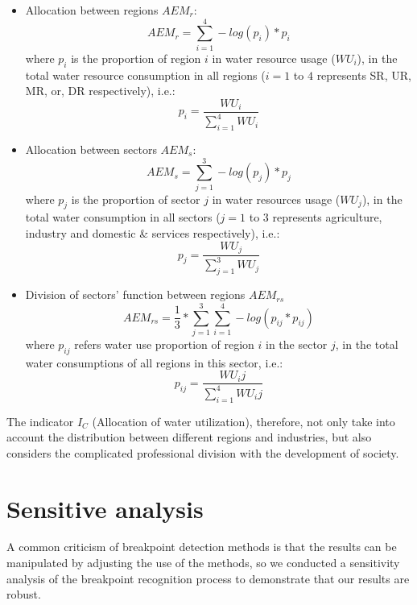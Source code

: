 \documentclass[9pt,twoside,lineno]{pnas-new}
\begin{document}
    \begin{itemize}
        \item Allocation between regions $AEM_r$:
            $$ AEM_r = \sum_{i=1}^4 -log(p_{i}) * p_{i} $$
            where $p_i$ is the proportion of region $i$ in water resource usage ($WU_i$), in the total water resource consumption in all regions ($i=1$ to $4$ represents SR, UR, MR, or, DR respectively), i.e.:
            $$ p_i = \frac{WU_i}{\sum_{i=1}^4 WU_i} $$
        \item Allocation between sectors $AEM_s$:
            $$ AEM_s = \sum_{j=1}^3 -log(p_{j}) * p_{j} $$
            where $p_j$ is the proportion of sector $j$ in water resources usage ($WU_j$), in the total water consumption in all sectors ($j=1$ to $3$ represents agriculture, industry and domestic \& services respectively), i.e.:
            $$ p_j = \frac{WU_j}{\sum_{j=1}^3 WU_j} $$
        \item Division of sectors' function between regions $AEM_{rs}$
            $$ AEM_{rs} = \frac{1}{3} * \sum_{j=1}^3 \sum_{i=1}^4 -log(p_{ij} * p_{ij})$$
            where $p_{ij}$ refers water use proportion of region $i$ in the sector $j$, in the total water consumptions of all regions in this sector, i.e.:
            $$ p_{ij} = \frac{WU_ij}{\sum_{i=1}^4 WU_ij} $$
    \end{itemize}

    The indicator $I_C$ (Allocation of water utilization), therefore, not only take into account the distribution between different regions and industries, but also considers the complicated professional division with the development of society.


\newpage
\section*{Sensitive analysis}
A common criticism of breakpoint detection methods is that the results can be manipulated by adjusting the use of the methods, so we conducted a sensitivity analysis of the breakpoint recognition process to demonstrate that our results are robust.
\end{document}
